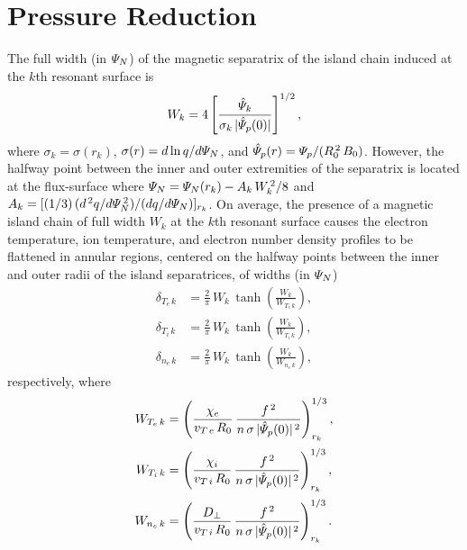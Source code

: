 \documentclass[notitlepage,12pt]{article}
\begin{document}
\section{Pressure Reduction} \label{a5}
The full width (in ${\mit\Psi}_N$)  of the magnetic separatrix of the island chain induced at the $k$th resonant surface is
\begin{equation}
W_k = 4\left[\frac{\hat{\mit\Psi}_k}{\sigma_k\,|\hat{{\mit\Psi}}_p(0)|}\right]^{1/2},
\end{equation}
where $\sigma_k=\sigma(r_k)$, $\sigma(r) = d\ln q/d{\mit\Psi}_N$, and $\hat{\mit\Psi}_p(r) = {\mit\Psi}_p/(R_0^{\,2}\,B_0)$.  
However, the halfway point between the inner and outer extremities of the separatrix is located at the flux-surface where ${\mit\Psi}_N = {\mit\Psi}_N(r_k) - A_k\,W_k^{\,2}/8$ and $A_k = [(1/3)\,(d^{\,2}q/d{\mit\Psi}_N^{\,2})/(dq/d{\mit\Psi}_N)]_{r_k}$.
On average, the presence of a magnetic island chain of full width $W_k$ at the $k$th resonant surface
causes the electron temperature, ion temperature,  and electron number density profiles to be flattened in  annular regions, centered on the
halfway points between the inner and outer radii of the island separatrices, of widths (in ${\mit\Psi}_N$)
\begin{align}
\delta_{T_e\,k}& = \frac{2}{\pi}\,W_k\,\tanh\left(\frac{W_k}{W_{T_e\,k}}\right),\\[0.5ex]
\delta_{T_i\,k}& = \frac{2}{\pi}\,W_k\,\tanh\left(\frac{W_k}{W_{T_i\,k}}\right),\\[0.5ex]
\delta_{n_e\,k}& = \frac{2}{\pi}\,W_k\,\tanh\left(\frac{W_k}{W_{n_e\,k}}\right),
\end{align}
respectively, where
\begin{align}
W_{T_e\,k} &= \left(\frac{\chi_{e}}{v_{T\,e}\,R_0}\,\frac{f^{\,2}}{n\,\sigma\,|\hat{\mit\Psi}_p(0)|^{\,2}}\right)^{1/3}_{r_k},\\[0.5ex]
W_{T_i\,k} &= \left(\frac{\chi_{i}}{v_{T\,i}\,R_0}\,\frac{f^{\,2}}{n\,\sigma\,|\hat{\mit\Psi}_p(0)|^{\,2}}\right)^{1/3}_{r_k},\\[0.5ex]
W_{n_e\,k} &= \left(\frac{D_\perp}{v_{T\,i}\,R_0}\,\frac{f^{\,2}}{n\,\sigma\,|\hat{\mit\Psi}_p(0)|^{\,2}}\right)^{1/3}_{r_k}.
\end{align}
\end{document}
